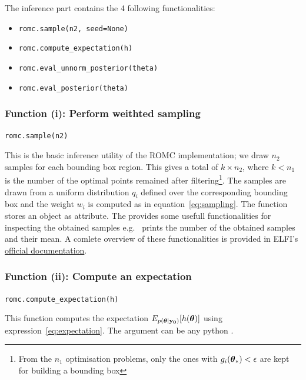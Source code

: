 The inference part contains the 4 following functionalities:

\begin{itemize}[label=(\roman*)]
\item \texttt{romc.sample(n2, seed=None)}
\item \texttt{romc.compute_expectation(h)}  
\item \texttt{romc.eval_unnorm_posterior(theta)}
\item \texttt{romc.eval_posterior(theta)}
\end{itemize}

\subsubsection*{Function (i): Perform weithted sampling}

\texttt{romc.sample(n2)}
\vspace{5mm}

\noindent
This is the basic inference utility of the ROMC implementation; we
draw $n_2$ samples for each bounding box region. This gives a total of
$k \times n_2$, where $k < n_1$ is the number of the optimal points
remained after filtering\footnote{From the $n_1$ optimisation
  problems, only the ones with $g_i(\boldsymbol{\theta}_*) < \epsilon$ are kept
  for building a bounding box}. The samples are drawn from a uniform
distribution $q_i$ defined over the corresponding bounding box and the
weight $w_i$ is computed as in equation~\eqref{eq:sampling}. The
function stores an  object as
 attribute. The  provides
some usefull functionalities for inspecting the obtained samples e.g.\
 prints the number of the obtained
samples and their mean. A comlete overview of these functionalities is
provided in ELFI's
\href{https://elfi.readthedocs.io/en/latest/api.html#elfi.methods.results.Sample}{official
  documentation}.

\subsubsection*{Function (ii): Compute an expectation}

\texttt{romc.compute_expectation(h)}
\vspace{5mm}

\noindent
This function computes the expectation
$E_{p(\boldsymbol{\theta}|\mathbf{y_0})}[h(\boldsymbol{\theta})]$ using
expression~\eqref{eq:expectation}. The argument  can be
any python \pinline{Callable}.

